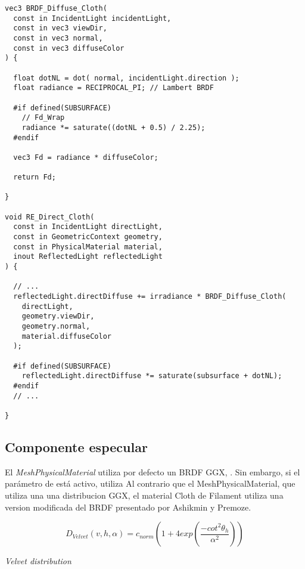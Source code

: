   \singlespacing
  \begin{lstlisting}[caption=Implementaci\'on del BRDF para la componente difusa de \textit{MeshClothMaterial}]
vec3 BRDF_Diffuse_Cloth(
  const in IncidentLight incidentLight,
  const in vec3 viewDir,
  const in vec3 normal,
  const in vec3 diffuseColor
) {

  float dotNL = dot( normal, incidentLight.direction );
  float radiance = RECIPROCAL_PI; // Lambert BRDF
  
  #if defined(SUBSURFACE)
    // Fd_Wrap
    radiance *= saturate((dotNL + 0.5) / 2.25);
  #endif

  vec3 Fd = radiance * diffuseColor;

  return Fd;

}

void RE_Direct_Cloth(
  const in IncidentLight directLight,
  const in GeometricContext geometry,
  const in PhysicalMaterial material,
  inout ReflectedLight reflectedLight
) {

  // ...
  reflectedLight.directDiffuse += irradiance * BRDF_Diffuse_Cloth(
    directLight,
    geometry.viewDir,
    geometry.normal,
    material.diffuseColor
  );

  #if defined(SUBSURFACE)
    reflectedLight.directDiffuse *= saturate(subsurface + dotNL); 
  #endif
  // ...

}
  \end{lstlisting}


  \subsection{Componente especular}

  El \textit{MeshPhysicalMaterial} utiliza por defecto un BRDF GGX, \autocite{ggx}. Sin embargo, si el par\'ametro de 
  est\'a activo, utiliza 
  Al contrario que el MeshPhysicalMaterial, que utiliza una una distribucion GGX, el material
  Cloth de Filament utiliza una  version modificada del BRDF presentado por Ashikmin y Premoze.
  \autocite{ashikhmin}\\

  \begin{eqfloat}[!htb]
    \begin{equation}
      D_{Velvet}(v, h, \alpha) = c_{norm} (
        1 + 4exp \left(\frac{-cot^2\theta_h}{\alpha^2}\right)
      )
    \end{equation}
  \caption{\textit{Velvet distribution} \autocite{ashikhmin}}
  \end{eqfloat}

